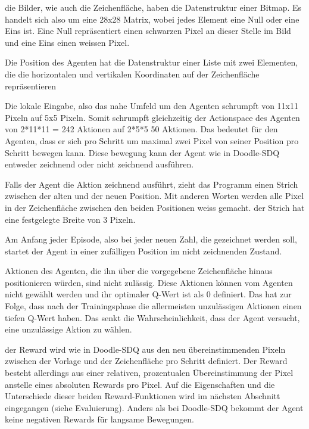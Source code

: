 die Bilder, wie auch die Zeichenfläche, haben die Datenstruktur einer Bitmap. Es
handelt sich also um eine 28x28 Matrix, wobei jedes Element eine Null oder eine
Eins ist. Eine Null repräsentiert einen schwarzen Pixel an dieser Stelle im Bild
und eine Eins einen weissen Pixel.

Die Position des Agenten hat die Datenstruktur einer Liste mit zwei Elementen,
die die horizontalen und vertikalen Koordinaten auf der Zeichenfläche
repräsentieren

Die lokale Eingabe, also das nahe Umfeld um den Agenten schrumpft von 11x11
Pixeln auf 5x5 Pixeln. Somit schrumpft gleichzeitig der Actionspace des Agenten
von 2*11*11 = 242 Aktionen auf 2*5*5 50 Aktionen. Das bedeutet für den Agenten,
dass er sich pro Schritt um maximal zwei Pixel von seiner Position pro Schritt
bewegen kann. Diese bewegung kann der Agent wie in Doodle-SDQ entweder
zeichnend oder nicht zeichnend ausführen.

Falls der Agent die Aktion zeichnend ausführt, zieht das Programm einen Strich
zwischen der alten und der neuen Position. Mit anderen Worten werden alle Pixel
in der Zeichenfläche zwischen den beiden Positionen weiss gemacht. der Strich
hat eine festgelegte Breite von 3 Pixeln.

Am Anfang jeder Episode, also bei jeder neuen Zahl, die gezeichnet werden soll,
startet der Agent in einer zufälligen Position im nicht zeichnenden Zustand.

Aktionen des Agenten, die ihn über die vorgegebene Zeichenfläche hinaus
positionieren würden, sind nicht zulässig. Diese Aktionen können vom Agenten
nicht gewählt werden und ihr optimaler Q-Wert ist als 0 definiert. Das hat zur
Folge, dass nach der Trainingsphase die allermeisten unzulässigen Aktionen einen
tiefen Q-Wert haben. Das senkt die Wahrscheinlichkeit, dass der Agent versucht,
eine unzulässige Aktion zu wählen.

der Reward wird wie in Doodle-SDQ aus den neu übereinstimmenden Pixeln zwischen
der Vorlage und der Zeichenfläche pro Schritt definiert. Der Reward besteht
allerdings aus einer relativen, prozentualen Übereinstimmung der Pixel anstelle
eines absoluten Rewards pro Pixel. Auf die Eigenschaften und
die Unterschiede dieser beiden Reward-Funktionen wird im nächsten Abschnitt
eingegangen (siehe Evaluierung).
Anders als bei Doodle-SDQ bekommt der Agent keine negativen Rewards für langsame Bewegungen. 


